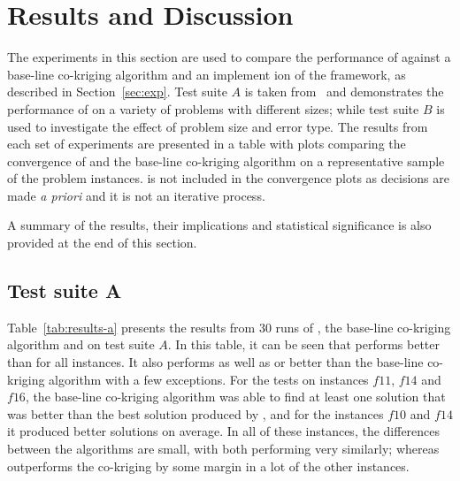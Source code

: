 \section{Results and Discussion}\label{sec:results}
The experiments in this section are used to compare the performance of \AlgName{} against a base-line co-kriging algorithm and an implement ion of the \motos{} framework, as described in Section~\ref{sec:exp}. Test suite $A$ is taken from~\cite{lv2021multi} and demonstrates the performance of \AlgName{} on a variety of problems with different sizes; while test suite $B$ is used to investigate the effect of problem size and error type. The results from each set of experiments are presented in a table with plots comparing the convergence of \AlgName{} and the base-line co-kriging algorithm on a representative sample of the problem instances. \motos{} is not included in the convergence plots as decisions are made \emph{a priori} and it is not an iterative process.

A summary of the results, their implications and statistical significance is also provided at the end of this section.

\subsection*{Test suite A}

Table~\ref{tab:results-a} presents the results from 30 runs of \AlgName{}, the base-line co-kriging algorithm and \motos{} on test suite $A$. In this table, it can be seen that \AlgName{} performs better than \motos{} for all instances. It also performs as well as or better than the base-line co-kriging algorithm with a few exceptions. For the tests on instances $f11$, $f14$ and $f16$, the base-line co-kriging algorithm was able to find at least one solution that was better than the best solution produced by \AlgName{}, and for the instances $f10$ and $f14$ it produced better solutions on average. In all of these instances, the differences between the algorithms are small, with both performing very similarly; whereas \AlgName{} outperforms the co-kriging by some margin in a lot of the other instances.

